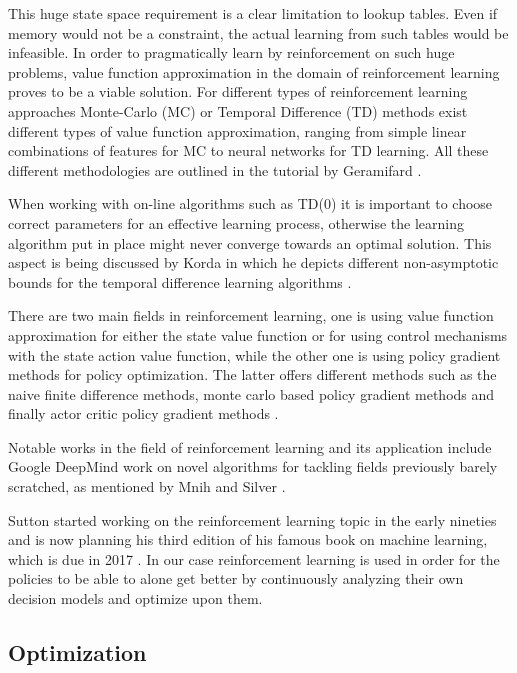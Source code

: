 \documentclass{seal_thesis}
\begin{document}
This huge state space requirement is a clear limitation to lookup tables. Even if memory would not be a constraint, the actual learning from such tables would be infeasible. In order to pragmatically learn by reinforcement on such huge problems, value function approximation in the domain of reinforcement learning proves to be a viable solution. For different types of reinforcement learning approaches \ie Monte-Carlo (MC) or Temporal Difference (TD) methods exist different types of value function approximation, ranging from simple linear combinations of features for MC to neural networks for TD learning. All these different methodologies are outlined in the tutorial by Geramifard \cite{Geramifard2013}.

When working with on-line algorithms such as TD(0) it is important to choose correct parameters for an effective learning process, otherwise the learning algorithm put in place might never converge towards an optimal solution. This aspect is being discussed by Korda in which he depicts different non-asymptotic bounds for the temporal difference learning algorithms \cite{Korda2014}.

There are two main fields in reinforcement learning, one is using value function approximation for either the state value function or for using control mechanisms with the state action value function, while the other one is using policy gradient methods for policy optimization. The latter offers different methods such as the naive finite difference methods, monte carlo based policy gradient methods and finally actor critic policy gradient methods \cite{Silver2014}.

Notable works in the field of reinforcement learning and its application include Google DeepMind work on novel algorithms for tackling fields previously barely scratched, as mentioned by Mnih \etal and Silver \etal \cite{Mnih2015,Silver2016}.

Sutton started working on the reinforcement learning topic in the early nineties and is now planning his third edition of his famous book on machine learning, which is due in 2017 \cite{Sutton2017}. In our case reinforcement learning is used in order for the policies to be able to alone get better by continuously analyzing their own decision models and optimize upon them.

\subsection{Optimization}
\end{document}

